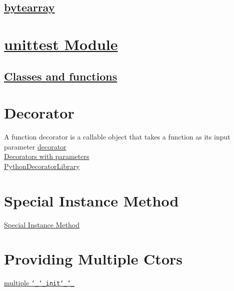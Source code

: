 \subsection{\href{https://docs.python.org/3/library/stdtypes.html\#bytearray}{bytearray}}

\newpage
\section{\href{https://docs.python.org/3/library/unittest.html\#module-unittest}{unittest Module}}
\subsection{\href{https://docs.python.org/3/library/unittest.html\#classes-and-functions}{Classes and functions}}


\newpage
\section{Decorator}
A function decorator is a callable object that takes a function as its 
input parameter
\href{https://www.programiz.com/python-programming/decorator}{decorator} \\
\href{https://www.geeksforgeeks.org/decorators-with-parameters-in-python/}{Decorators with parameters} \\
\href{https://wiki.python.org/moin/PythonDecoratorLibrary}{PythonDecoratorLibrary}
\newpage{}
\section{Special Instance Method}
\href{https://docs.python.org/3/reference/datamodel.html#specialnames}{Special Instance Method}


\section{Providing Multiple Ctors}
\href{https://realpython.com/python-multiple-constructors/}{multiple \texttt{\char`_\char`_init\char`_\char`_}}

\newpage
